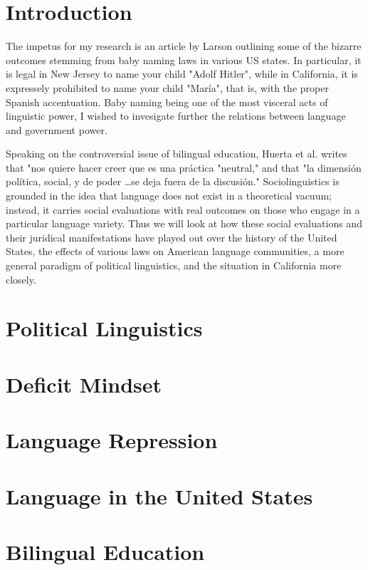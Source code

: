 \documentclass{article}
\begin{document}
\section*{Introduction}

The impetus for my research is an article by Larson outlining some of the
bizarre outcomes stemming from baby naming laws in various US states. In
particular, it is legal in New Jersey to name your child "Adolf Hitler", while
in California, it is expressely prohibited to name your child "María", that is,
with the proper Spanish accentuation. Baby naming being one of the most visceral
acts of linguistic power, I wished to invesigate further the relations between
language and government power.

Speaking on the controversial issue of bilingual education, Huerta et al. writes
that "nos quiere hacer creer que es una práctica "neutral," and that "la
dimensión política, social, y de poder \ldots se deja fuera de la discusión."
Sociolinguistics is grounded in the idea that language does not exist in a
theoretical vacuum; instead, it carries social evaluations with real outcomes on
those who engage in a particular language variety. Thus we will look at how
these social evaluations and their juridical manifestations have played out over
the history of the United States, the effects of various laws on American
language communities, a more general paradigm of political linguistics, and the
situation in California more closely.

\section*{Political Linguistics}


\section*{Deficit Mindset}


\section*{Language Repression}

\section*{Language in the United States}


\section*{Bilingual Education}
\end{document}
